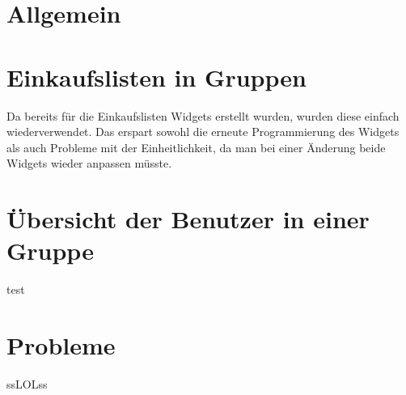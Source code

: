 \hypertarget{allgemein}{%
\section{Allgemein}\label{allgemein}}

\hypertarget{einkaufslisten-in-gruppen}{%
\section{Einkaufslisten in Gruppen}\label{einkaufslisten-in-gruppen}}

Da bereits für die Einkaufslisten Widgets erstellt wurden, wurden diese
einfach wiederverwendet. Das erspart sowohl die erneute Programmierung
des Widgets als auch Probleme mit der Einheitlichkeit, da man bei einer
Änderung beide Widgets wieder anpassen müsste.

\hypertarget{uxfcbersicht-der-benutzer-in-einer-gruppe}{%
\section{Übersicht der Benutzer in einer
Gruppe}\label{uxfcbersicht-der-benutzer-in-einer-gruppe}}

test

\hypertarget{probleme}{%
\section{Probleme}\label{probleme}}

ssLOLss
